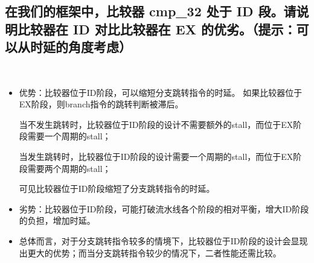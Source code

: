 \documentclass{article}
\begin{document}
\newpage
\subsection{在我们的框架中，比较器 cmp\_32 处于 ID 段。请说明比较器在 ID 对比比较器在 EX 的优劣。（提示：可以从时延的角度考虑）}

~\par
\begin{itemize}
    \item 优势：比较器位于ID阶段，可以缩短分支跳转指令的时延。
    如果比较器位于EX阶段，则branch指令的跳转判断被滞后。\par
    当不发生跳转时，比较器位于ID阶段的设计不需要额外的stall，而位于EX阶段需要一个周期的stall；\par
    当发生跳转时，比较器位于ID阶段的设计需要一个周期的stall，而位于EX阶段需要两个周期的stall；\par
    可见比较器位于ID阶段缩短了分支跳转指令的时延。

    \item 劣势：比较器位于ID阶段，可能打破流水线各个阶段的相对平衡，增大ID阶段的负担，增加时延。
    \item 总体而言，对于分支跳转指令较多的情境下，比较器位于ID阶段的设计会显现出更大的优势；而当分支跳转指令较少的情况下，二者性能还需比较。
\end{itemize}
\end{document}
